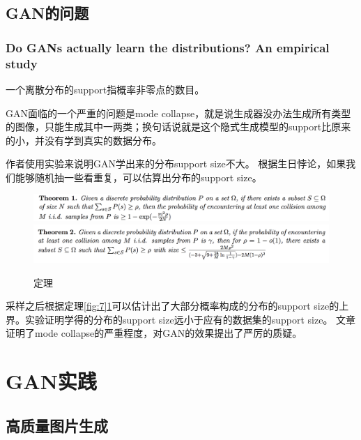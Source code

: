 \documentclass[a4paper]{article}
\begin{document}
\subsection{GAN的问题}
\subsubsection{Do GANs actually learn the distributions? An empirical study\cite{DBLP:journals/corr/AroraZ17}}
一个离散分布的support指概率非零点的数目。

GAN面临的一个严重的问题是mode collapse，就是说生成器没办法生成所有类型的图像，只能生成其中一两类；换句话说就是这个隐式生成模型的support比原来的小，并没有学到真实的数据分布。

作者使用实验来说明GAN学出来的分布support size不大。
根据生日悖论，如果我们能够随机抽一些看重复，可以估算出分布的support size。
\begin{figure}[H]
\centering
\includegraphics[width=\textwidth]{./img/7.png}
\label{fig:7}
\centering
\includegraphics[width=\textwidth]{./img/8.png}
\caption{定理}
\label{fig:8}
\end{figure}

采样之后根据定理\ref{fig:7}\ref{fig:8}可以估计出了大部分概率构成的分布的support size的上界。实验证明学得的分布的support size远小于应有的数据集的support size。
文章证明了mode collapse的严重程度，对GAN的效果提出了严厉的质疑。
\section{GAN实践}
\subsection{高质量图片生成}
\end{document}
